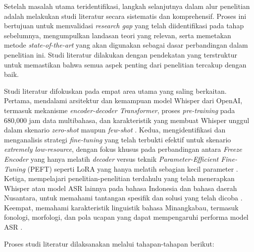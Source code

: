 Setelah masalah utama teridentifikasi, langkah selanjutnya dalam alur penelitian adalah melakukan studi literatur secara sistematis dan komprehensif. Proses ini bertujuan untuk memvalidasi \textit{research gap} yang telah diidentifikasi pada tahap sebelumnya, mengumpulkan landasan teori yang relevan, serta memetakan metode \textit{state-of-the-art} yang akan digunakan sebagai dasar perbandingan dalam penelitian ini. Studi literatur dilakukan dengan pendekatan yang terstruktur untuk memastikan bahwa semua aspek penting dari penelitian tercakup dengan baik.

Studi literatur difokuskan pada empat area utama yang saling berkaitan. Pertama, mendalami arsitektur dan kemampuan model Whisper dari OpenAI, termasuk mekanisme \textit{encoder-decoder Transformer}, proses \textit{pre-training} pada 680,000 jam data multibahasa, dan karakteristik yang membuat Whisper unggul dalam skenario \textit{zero-shot} maupun \textit{few-shot} \cite{radford2023whisper}. Kedua, mengidentifikasi dan menganalisis strategi \textit{fine-tuning} yang telah terbukti efektif untuk skenario \textit{extremely low-resource}, dengan fokus khusus pada perbandingan antara \textit{Freeze Encoder} yang hanya melatih \textit{decoder} versus teknik \textit{Parameter-Efficient Fine-Tuning} (PEFT) seperti LoRA yang hanya melatih sebagian kecil parameter \cite{liu2024exploration,hu2022lora}. Ketiga, mempelajari penelitian-penelitian terdahulu yang telah menerapkan Whisper atau model ASR lainnya pada bahasa Indonesia dan bahasa daerah Nusantara, untuk memahami tantangan spesifik dan solusi yang telah dicoba \cite{arisaputra2022xlsr53,martin2026speechsummary}. Keempat, memahami karakteristik linguistik bahasa Minangkabau, termasuk fonologi, morfologi, dan pola ucapan yang dapat mempengaruhi performa model ASR \cite{koto2020minangkabau,sovia2022minangkabau}.

Proses studi literatur dilaksanakan melalui tahapan-tahapan berikut:

